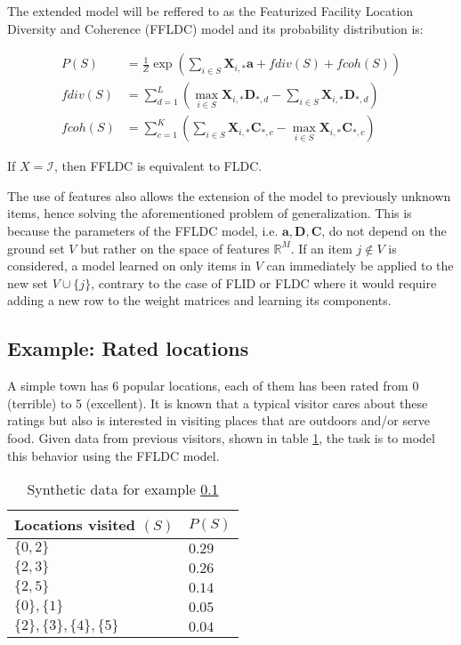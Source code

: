 The extended model will be reffered to as the Featurized Facility Location Diversity and Coherence (FFLDC) model and its probability distribution is:

\begin{align}
  \tag{FFLDC}
  P(S) &= \frac{1}{Z}\exp{\left(\sum_{i \in S}{\mathbf{X}_{i,*}\mathbf{a}} + fdiv(S) + fcoh(S)\right)} \\
  fdiv(S) &= \sum_{d=1}^{L}{\left(\max_{i \in S}{\mathbf{X}_{i,*}\mathbf{D}_{*,d}} - \sum_{i \in S}{\mathbf{X}_{i,*}\mathbf{D}_{*,d}}\right)} \\
  fcoh(S) &= \sum_{c=1}^{K}{\left(\sum_{i \in S}{\mathbf{X}_{i,*}\mathbf{C}_{*,c}} - \max_{i \in S}{\mathbf{X}_{i,*}\mathbf{C}_{*,c}}\right)}
  \label{eq:ffldc}
\end{align}

\begin{remark}
  If $X = \mathcal{I}$, then FFLDC is equivalent to FLDC.
\end{remark}

The use of features also allows the extension of the model to previously unknown items, hence solving the aforementioned problem of generalization. This is because the parameters of the FFLDC model, i.e. $\mathbf{a}, \mathbf{D}, \mathbf{C}$, do not depend on the ground set $V$ but rather on the space of features $\mathbb{R}^{M}$. If an item $j \notin V$ is considered, a model learned on only items in $V$ can immediately be applied to the new set $V \cup \{j\}$, contrary to the case of FLID or FLDC where it would require adding a new row to the weight matrices and learning its components.

\subsection{Example: Rated locations}
\label{sec:ffldc-toy}

A simple town has 6 popular locations, each of them has been rated from 0 (terrible) to 5 (excellent). It is known that a typical visitor cares about these ratings but also is interested in visiting places that are outdoors and/or serve food. Given data from previous visitors, shown in table \ref{tab:ffldc-toy-probs}, the task is to model this behavior using the FFLDC model.

\begin{table}
  \centering
  \caption{Synthetic data for example \ref{sec:ffldc-toy}}
  \begin{tabular}{@{}ll@{}}
    \toprule
    Locations visited $(S)$ & $P(S)$  \\
    \midrule
    $\{0,2\}$ & $0.29$ \\
    $\{2,3\}$ & $0.26$ \\
    $\{2,5\}$ & $0.14$ \\
    $\{0\}, \{1\}$ & $0.05$ \\
    $\{2\}, \{3\}, \{4\}, \{5\}$ & $0.04$ \\
    \bottomrule
  \end{tabular}
  \label{tab:ffldc-toy-probs}
\end{table}

